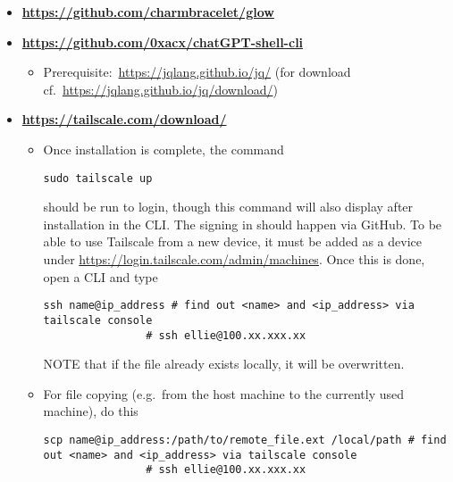 \documentclass[12pt, a4paper]{article}
\numberwithin{equation}{section}
\theoremstyle{definition}
\theoremstyle{definition}
\begin{document}
	\begin{itemize}
		\item \textbf{\url{https://github.com/charmbracelet/glow}}
		\item \textbf{\url{https://github.com/0xacx/chatGPT-shell-cli}}
		
		\begin{itemize}
			\item Prerequisite:~\url{https://jqlang.github.io/jq/} (for download cf.~\url{https://jqlang.github.io/jq/download/})
		\end{itemize}
		
		\item \textbf{\url{https://tailscale.com/download/}}
		
		\begin{itemize}
			\item Once installation is complete, the command 
			
			\begin{lstlisting}[style=mystylepython, label=alg:tailscale_login, xleftmargin=\parindent]
				sudo tailscale up
			\end{lstlisting}
		
			should be run to login, though this command will also display after installation in the CLI. The signing in should happen via GitHub. To be able to use Tailscale from a new device, it must be added as a device under \url{https://login.tailscale.com/admin/machines}. Once this is done, open a CLI and type 
			
			\begin{lstlisting}[style=mystylepython, label=alg:tailscale_connec, xleftmargin=\parindent]
				ssh name@ip_address # find out <name> and <ip_address> via tailscale console
				# ssh ellie@100.xx.xxx.xx
			\end{lstlisting}
		
			NOTE that if the file already exists locally, it will be overwritten.
			
			\item For file copying (e.g.~from the host machine to the currently used machine), do this
			
			\begin{lstlisting}[style=mystylepython, label=alg:tailscale__scp_file, xleftmargin=\parindent]
				scp name@ip_address:/path/to/remote_file.ext /local/path # find out <name> and <ip_address> via tailscale console
				# ssh ellie@100.xx.xxx.xx
			\end{lstlisting}
			

\end{itemize}
\end{itemize}
\end{document}
